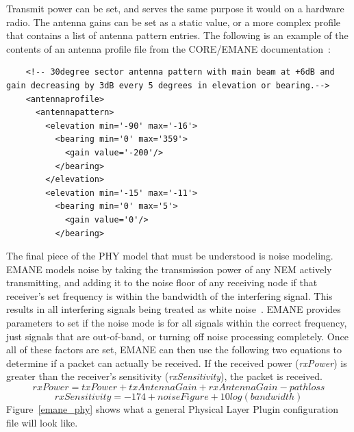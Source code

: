 Transmit power can be set, and serves the same purpose it would on a hardware radio.
The antenna gains can be set as a static value, or a more complex profile that contains a list of antenna pattern entries.
The following is an example of the contents of an antenna profile file from the CORE/EMANE documentation~\cite{core}:
\begin{center}
\begin{minipage}{\textwidth}
    \begin{verbatim}
    <!-- 30degree sector antenna pattern with main beam at +6dB and gain decreasing by 3dB every 5 degrees in elevation or bearing.-->
    <antennaprofile>
      <antennapattern>
        <elevation min='-90' max='-16'>
          <bearing min='0' max='359'>
            <gain value='-200'/>
          </bearing>
        </elevation>
        <elevation min='-15' max='-11'>
          <bearing min='0' max='5'>
            <gain value='0'/>
          </bearing>
    \end{verbatim}
\end{minipage}
\end{center}\par
The final piece of the PHY model that must be understood is noise modeling.
EMANE models noise by taking the transmission power of any NEM actively transmitting, and adding it to the noise floor of any receiving node if that receiver's set frequency is within the bandwidth of the interfering signal.
This results in all interfering signals being treated as white noise~\cite{emane_phy}.
EMANE provides parameters to set if the noise mode is for all signals within the correct frequency, just signals that are out-of-band, or turning off noise processing completely.
Once all of these factors are set, EMANE can then use the following two equations to determine if a packet can actually be received.
If the received power (\textit{rxPower}) is greater than the receiver's sensitivity (\textit{rxSensitivity}), the packet is received.
\[ rxPower = txPower + txAntennaGain + rxAntennaGain - pathloss \]
\[ rxSensitivity = -174 + noiseFigure + 10log(bandwidth) \]
Figure~\ref{emane_phy} shows what a general Physical Layer Plugin configuration file will look like.\par


